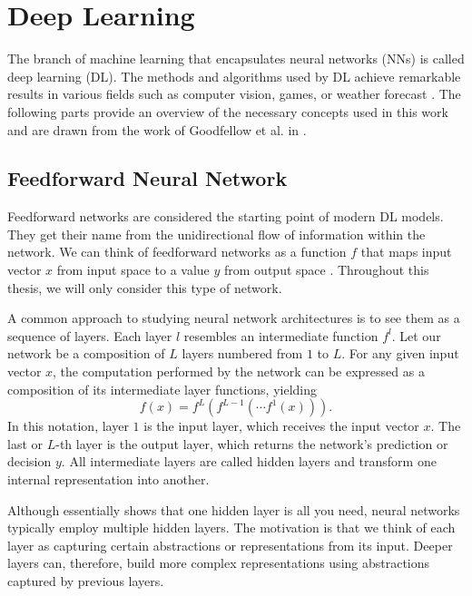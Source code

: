 \section{Deep Learning}\label{section:dl}

The branch of machine learning that encapsulates neural networks (NNs) is called deep learning (DL).
The methods and algorithms used by DL achieve remarkable results in various fields such as computer vision, games, or weather forecast \cite{alexnet, alphago, weather}. The following parts provide an overview of the necessary concepts used in this work and are drawn from the work of Goodfellow et al. in \cite{goodfellow}.

\subsection*{Feedforward Neural Network}\label{feedforward-nn}

Feedforward networks are considered the starting point of modern DL models.
They get their name from the unidirectional flow of information within the network.
We can think of feedforward networks as a function $f$ that maps input vector $x$ from input space to a value $y$ from output space \cite{goodfellow}.
Throughout this thesis, we will only consider this type of network.

A common approach to studying neural network architectures is to see them as a sequence of layers.
Each layer $l$ resembles an intermediate function $f^l$.
Let our network be a composition of $L$ layers numbered from $1$ to $L$.
For any given input vector $x$, the computation performed by the network can be expressed as a composition of its intermediate layer functions, yielding
\begin{equation}
    f(x) = f^L(f^{L-1}(\cdots f^1(x))).
\end{equation}
In this notation, layer $1$ is the input layer, which receives the input vector $x$.
The last or $L$-th layer is the output layer, which returns the network's prediction or decision $y$.
All intermediate layers are called hidden layers and transform one internal representation into another.

Although \cite{cybenko} essentially shows that one hidden layer is all you need, neural networks typically employ multiple hidden layers.
The motivation is that we think of each layer as capturing certain abstractions or representations from its input.
Deeper layers can, therefore, build more complex representations using abstractions captured by previous layers.

